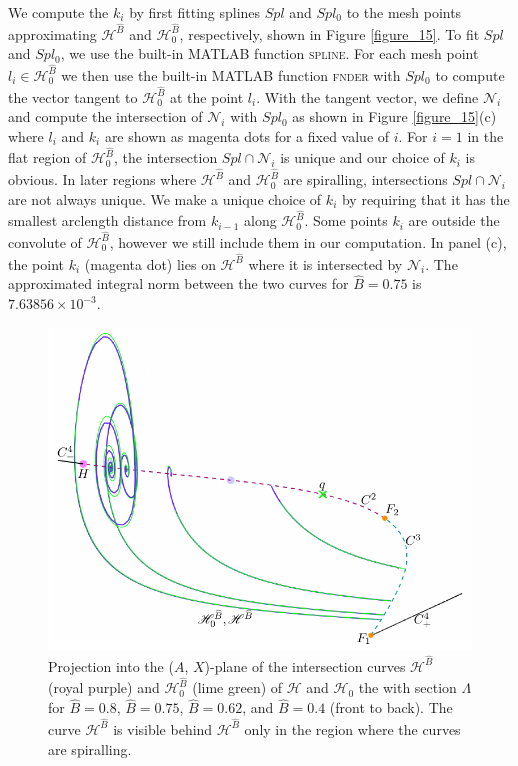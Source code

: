 \documentclass{ws-ijbc}
\begin{document}
We compute the $k_i$ by first fitting splines $Spl$ and $Spl_0$ to the mesh points approximating $\mathscr{H}^{\widehat{B}}$ and $\mathscr{H}_0^{\widehat{B}}$, respectively, shown in Figure \ref{figure_15}.  To fit $Spl$ and $Spl_0$, we use the built-in \textsc{MATLAB} function \textsc{spline}.  For each mesh point $l_i \in \mathscr{H}_0^{\widehat{B}}$ we then use the built-in \textsc{MATLAB} function \textsc{fnder} with $Spl_0$ to compute the vector tangent to $\mathscr{H}_0^{\widehat{B}}$ at the point $l_i$.  With the tangent vector, we define $\mathscr{N}_i$ and compute the intersection of $\mathscr{N}_i$ with $Spl_0$ as shown in Figure \ref{figure_15}(c) where $l_i$ and $k_i$ are shown as magenta dots for a fixed value of $i$.  For $i=1$ in the flat region of $\mathscr{H}_0^{\widehat{B}}$, the intersection $Spl \cap \mathscr{N}_i$ is unique and our choice of $k_i$ is obvious.  In later regions where $\mathscr{H}^{\widehat{B}}$ and $\mathscr{H}_0^{\widehat{B}}$ are spiralling, intersections $Spl \cap \mathscr{N}_i$ are not always unique.  We make a unique choice of $k_i$ by requiring that it has the smallest arclength distance from $k_{i-1}$ along $\mathscr{H}_0^{\widehat{B}}$.  Some points $k_i$ are outside the convolute of $\mathscr{H}_0^{\widehat{B}}$, however we still include them in our computation.  In panel (c), the point $k_i$ (magenta dot) lies on $\mathscr{H}^{\widehat{B}}$ where it is intersected by $\mathscr{N}_i$.  The approximated integral norm between the two curves for $\widehat{B} = 0.75$ is $7.63856 \times 10^{-3}$.

\begin{figure}[H]
\centering
\includegraphics[]{./figures/MKMO_16.pdf}
\caption{Projection into the ($A$, $X$)-plane of the intersection curves $\mathscr{H}^{\widehat{B}}$ (royal purple) and $\mathscr{H}_0^{\widehat{B}}$ (lime green) of $\mathscr{H}$ and $\mathscr{H}_0$ the with section $\Lambda$ for $\widehat{B}=0.8$, $\widehat{B}=0.75$, $\widehat{B}=0.62$, and $\widehat{B}=0.4$ (front to back).  The curve $\mathscr{H}^{\widehat{B}}$ is visible behind $\mathscr{H}^{\widehat{B}}$ only in the region where the curves are spiralling.}
\label{figure_16}
\end{figure}
\end{document}
